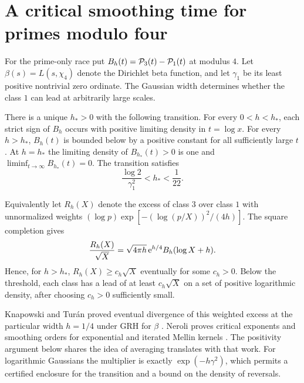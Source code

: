 \section{A critical smoothing time for primes modulo four}\label{sec:four}

For the prime-only race put $B_h(t)=\mathcal P_3(t)-\mathcal P_1(t)$ at modulus $4$.
Let $\beta(s)=L(s,\chi_4)$ denote the Dirichlet beta function,
and let $\gamma_1$ be its least positive nontrivial zero ordinate.
The Gaussian width determines whether the class $1$ can lead at
arbitrarily large scales.

\begin{theorem}\label{th:transition}
There is a unique $h_*>0$ with the following transition. For every
$0<h<h_*$, each strict sign of $B_h$ occurs with positive limiting
density in $t=\log x$. For every $h>h_*$, $B_h(t)$ is bounded below
by a positive constant for all sufficiently large $t$. At $h=h_*$
the limiting density of $B_{h_*}(t)>0$ is one and
$\liminf_{t\to\infty}B_{h_*}(t)=0$. The transition satisfies
\[
                 \frac{\log 2}{\gamma_1^2}< h_* < \frac1{22}.
\]
\end{theorem}

Equivalently let \(R_h(X)\) denote the excess of class \(3\) over class \(1\) with unnormalized weights \((\log p)\exp[-(\log(p/X))^2/(4h)]\). The square completion gives
\[
 \frac{R_h(X)}{\sqrt{X}}=\sqrt{4\pi h}\,\mathrm e^{h/4} B_h(\log X+h).
\]
Hence, for \(h>h_*\), \(R_h(X)\ge c_h\sqrt X\) eventually for some \(c_h>0\). Below the threshold, each class has a lead of at least \(c_h\sqrt X\) on a set of positive logarithmic density, after choosing \(c_h>0\) sufficiently small.

Knapowski and Tur\'an proved eventual divergence of this weighted excess at the particular width \(h=1/4\) under GRH for \(\beta\) \cite{kt,bp,suzuki}. Neroli proves critical exponents and smoothing orders for exponential and iterated Mellin kernels \cite[Theorems 2.2 and 3.3]{neroli}. The positivity argument below shares the idea of averaging translates with that work. For logarithmic Gaussians the multiplier is exactly \(\exp(-h\gamma^2)\), which permits a certified enclosure for the transition and a bound on the density of reversals.

